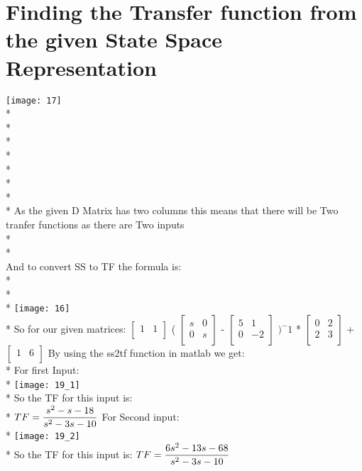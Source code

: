 \documentclass{article}
\begin{document}
\section{Finding the Transfer function from the given State Space Representation}
\texttt{[image: 17]}\\*\\*\\*\\*\\*\\*\\*\\*
As the given D Matrix has two columns this means that there will be Two tranfer functions as there are Two inputs\\*\\*\\
And to convert SS to TF the formula is:\\*\\*\\*
\texttt{[image: 16]}\\*
So for our given matrices:
$
\begin{bmatrix}
1 & 1\\
\end{bmatrix}
$
(
$
\begin{bmatrix}
s & 0\\
0 & s\\
\end{bmatrix}
$
-
$
\begin{bmatrix}
5 & 1\\
0 & -2\\
\end{bmatrix}
$
$)^-1$
*
$
\begin{bmatrix}
0 & 2\\
2 & 3\\
\end{bmatrix}
$
+
$
\begin{bmatrix}
1 & 6\\
\end{bmatrix}
$
By using the ss2tf function in matlab we get:\\*
For first Input:\\*
\texttt{[image: 19\_1]}\\*
So the TF for this input is:\\*
$
TF = {\displaystyle\frac{s^2-s-18}{s^2-3s-10}}\\*
$
For Second input:\\*
\texttt{[image: 19\_2]}\\*
So the TF for this input is:
$
TF = {\displaystyle\frac{6s^2-13s-68}{s^2-3s-10}}\\*
$
\end{document}
